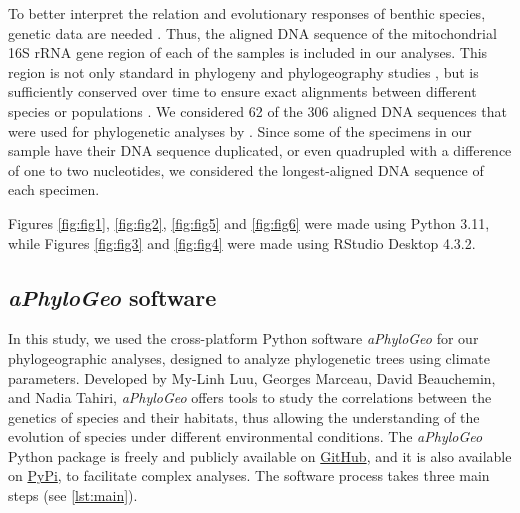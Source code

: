 To better interpret the relation and evolutionary responses of benthic species, genetic data are needed \citep{wilson_speciation_1987, uhlir_adding_2021}. Thus, the aligned DNA sequence of the mitochondrial 16S rRNA gene region of each of the samples is included in our analyses. This region is not only standard in phylogeny and phylogeography studies \citep{hugenholtz1998impact}, but is sufficiently conserved over time to ensure exact alignments between different species or populations \citep{saccone1999evolutionary}. We considered 62 of the 306 aligned DNA sequences that were used for phylogenetic analyses by \citep{uhlir_adding_2021}. Since some of the specimens in our sample have their DNA sequence duplicated, or even quadrupled with a difference of one to two nucleotides, we considered the longest-aligned DNA sequence of each specimen. 

Figures \ref{fig:fig1}, \ref{fig:fig2}, \ref{fig:fig5} and \ref{fig:fig6} were made using Python 3.11, while Figures \ref{fig:fig3} and \ref{fig:fig4} were made using RStudio Desktop 4.3.2.

\subsection{\textit{aPhyloGeo} software}

In this study, we used the cross-platform Python software \textit{aPhyloGeo} for our phylogeographic analyses, designed to analyze phylogenetic trees using climate parameters. Developed by My-Linh Luu, Georges Marceau, David Beauchemin, and Nadia Tahiri, \textit{aPhyloGeo} offers tools to study the correlations between the genetics of species and their habitats, thus allowing the understanding of the evolution of species under different environmental conditions. The \textit{aPhyloGeo} Python package is freely and publicly available on \href{https://github.com/tahiri-lab/aPhyloGeo}{GitHub}, and it is also available on \href{https://pypi.org/project/aphylogeo/}{PyPi}, to facilitate complex analyses. The software process takes three main steps (see \autoref{lst:main}).

